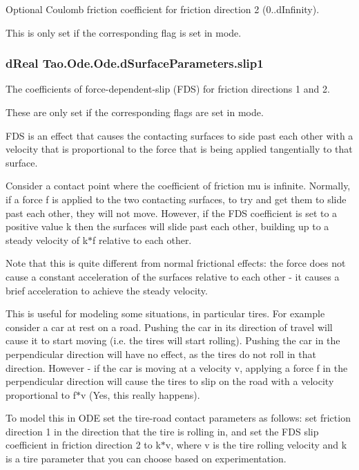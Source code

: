 Optional Coulomb friction coefficient for friction direction 2 (0..dInfinity). 

This is only set if the corresponding flag is set in mode. \hypertarget{struct_tao_1_1_ode_1_1_ode_1_1d_surface_parameters_a6fe751650e76028f7367e75a606817ae}{
\subsubsection[{slip1}]{\setlength{\rightskip}{0pt plus 5cm}dReal {\bf Tao.Ode.Ode.dSurfaceParameters.slip1}}}
\label{struct_tao_1_1_ode_1_1_ode_1_1d_surface_parameters_a6fe751650e76028f7367e75a606817ae}


The coefficients of force-\/dependent-\/slip (FDS) for friction directions 1 and 2. 

These are only set if the corresponding flags are set in mode.

FDS is an effect that causes the contacting surfaces to side past each other with a velocity that is proportional to the force that is being applied tangentially to that surface.

Consider a contact point where the coefficient of friction mu is infinite. Normally, if a force f is applied to the two contacting surfaces, to try and get them to slide past each other, they will not move. However, if the FDS coefficient is set to a positive value k then the surfaces will slide past each other, building up to a steady velocity of k$\ast$f relative to each other.

Note that this is quite different from normal frictional effects: the force does not cause a constant acceleration of the surfaces relative to each other -\/ it causes a brief acceleration to achieve the steady velocity.

This is useful for modeling some situations, in particular tires. For example consider a car at rest on a road. Pushing the car in its direction of travel will cause it to start moving (i.e. the tires will start rolling). Pushing the car in the perpendicular direction will have no effect, as the tires do not roll in that direction. However -\/ if the car is moving at a velocity v, applying a force f in the perpendicular direction will cause the tires to slip on the road with a velocity proportional to f$\ast$v (Yes, this really happens).

To model this in ODE set the tire-\/road contact parameters as follows: set friction direction 1 in the direction that the tire is rolling in, and set the FDS slip coefficient in friction direction 2 to k$\ast$v, where v is the tire rolling velocity and k is a tire parameter that you can choose based on experimentation.

